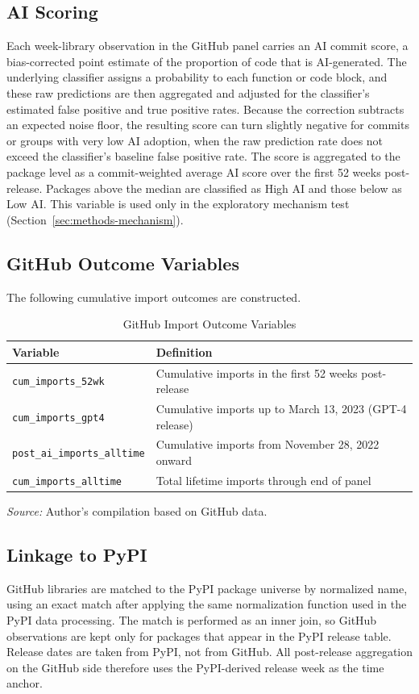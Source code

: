 \documentclass[12pt, a4paper]{report}
\begin{document}
\subsection{AI Scoring}
Each week-library observation in the GitHub panel carries an AI commit score, a bias-corrected point estimate of the proportion of code that is AI-generated. The underlying classifier assigns a probability to each function or code block, and these raw predictions are then aggregated and adjusted for the classifier's estimated false positive and true positive rates. Because the correction subtracts an expected noise floor, the resulting score can turn slightly negative for commits or groups with very low AI adoption, when the raw prediction rate does not exceed the classifier's baseline false positive rate. The score is aggregated to the package level as a commit-weighted average AI score over the first 52 weeks post-release. Packages above the median are classified as High AI and those below as Low AI. This variable is used only in the exploratory mechanism test (Section~\ref{sec:methods-mechanism}).

\subsection{GitHub Outcome Variables}
The following cumulative import outcomes are constructed.

\begin{table}[ht]
\centering
\caption{GitHub Import Outcome Variables}\label{tab:github-vars}
\small
\begin{tabular}{lp{10cm}}
\toprule
\textbf{Variable} & \textbf{Definition} \\ \midrule
\texttt{cum\_imports\_52wk} & Cumulative imports in the first 52 weeks post-release \\
\texttt{cum\_imports\_gpt4} & Cumulative imports up to March 13, 2023 (GPT-4 release) \\
\texttt{post\_ai\_imports\_alltime} & Cumulative imports from November 28, 2022 onward \\
\texttt{cum\_imports\_alltime} & Total lifetime imports through end of panel \\ \bottomrule
\end{tabular}
\par\smallskip\noindent\textit{Source:} Author's compilation based on GitHub data.
\end{table}

\subsection{Linkage to PyPI}
GitHub libraries are matched to the PyPI package universe by normalized name, using an exact match after applying the same normalization function used in the PyPI data processing. The match is performed as an inner join, so GitHub observations are kept only for packages that appear in the PyPI release table. Release dates are taken from PyPI, not from GitHub. All post-release aggregation on the GitHub side therefore uses the PyPI-derived release week as the time anchor.
\end{document}
